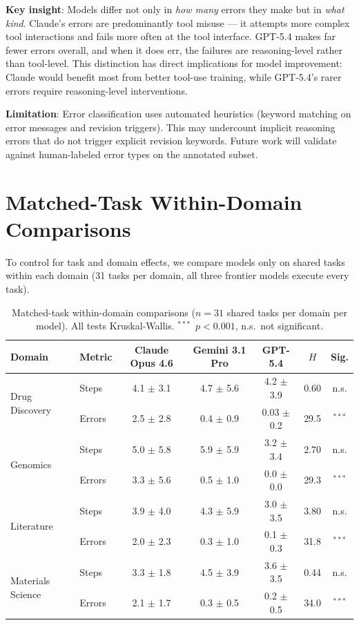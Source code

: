 \documentclass{article}
\begin{document}
\textbf{Key insight}: Models differ not only in \emph{how many} errors they make but in \emph{what kind}. Claude's errors are predominantly tool misuse --- it attempts more complex tool interactions and fails more often at the tool interface. GPT-5.4 makes far fewer errors overall, and when it does err, the failures are reasoning-level rather than tool-level. This distinction has direct implications for model improvement: Claude would benefit most from better tool-use training, while GPT-5.4's rarer errors require reasoning-level interventions.

\textbf{Limitation}: Error classification uses automated heuristics (keyword matching on error messages and revision triggers). This may undercount implicit reasoning errors that do not trigger explicit revision keywords. Future work will validate against human-labeled error types on the annotated subset.

\section{Matched-Task Within-Domain Comparisons}
\label{app:matched}

To control for task and domain effects, we compare models only on shared tasks within each domain (31 tasks per domain, all three frontier models execute every task).

\begin{table}[h]
\caption{Matched-task within-domain comparisons ($n{=}31$ shared tasks per domain per model). All tests Kruskal-Wallis. $^{***}$~$p{<}0.001$, n.s.~not significant.}
\label{tab:matched}
\centering\small
\begin{tabular}{llccccc}
\toprule
\textbf{Domain} & \textbf{Metric} & \textbf{Claude Opus 4.6} & \textbf{Gemini 3.1 Pro} & \textbf{GPT-5.4} & \textbf{$H$} & \textbf{Sig.} \\
\midrule
\multirow{2}{*}{Drug Discovery} & Steps & 4.1 $\pm$ 3.1 & 4.7 $\pm$ 5.6 & 4.2 $\pm$ 3.9 & 0.60 & n.s. \\
& Errors & 2.5 $\pm$ 2.8 & 0.4 $\pm$ 0.9 & 0.03 $\pm$ 0.2 & 29.5 & $^{***}$ \\
\midrule
\multirow{2}{*}{Genomics} & Steps & 5.0 $\pm$ 5.8 & 5.9 $\pm$ 5.9 & 3.2 $\pm$ 3.4 & 2.70 & n.s. \\
& Errors & 3.3 $\pm$ 5.6 & 0.5 $\pm$ 1.0 & 0.0 $\pm$ 0.0 & 29.3 & $^{***}$ \\
\midrule
\multirow{2}{*}{Literature} & Steps & 3.9 $\pm$ 4.0 & 4.3 $\pm$ 5.9 & 3.0 $\pm$ 3.5 & 3.80 & n.s. \\
& Errors & 2.0 $\pm$ 2.3 & 0.3 $\pm$ 1.0 & 0.1 $\pm$ 0.3 & 31.8 & $^{***}$ \\
\midrule
\multirow{2}{*}{Materials Science} & Steps & 3.3 $\pm$ 1.8 & 4.5 $\pm$ 3.9 & 3.6 $\pm$ 3.5 & 0.44 & n.s. \\
& Errors & 2.1 $\pm$ 1.7 & 0.3 $\pm$ 0.5 & 0.2 $\pm$ 0.5 & 34.0 & $^{***}$ \\
\bottomrule
\end{tabular}
\end{table}
\end{document}
